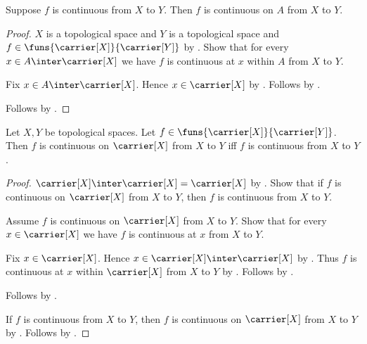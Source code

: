 \begin{corollary}\label{continuous_implies_continuous_on}
    Suppose $f$ is continuous from $X$ to $Y$.
    Then $f$ is continuous on $A$ from $X$ to $Y$.
\end{corollary}
\begin{proof}
    $X$ is a topological space and $Y$ is a topological space and
        $f\in\funs{\carrier[X]}{\carrier[Y]}$ by
        .
    Show that for every $x\in A\inter\carrier[X]$ we have
        $f$ is continuous at $x$ within $A$ from $X$ to $Y$.
    \begin{subproof}
        Fix $x\in A\inter\carrier[X]$.
        Hence $x\in\carrier[X]$ by .
        Follows by .
    \end{subproof}
    Follows by .
\end{proof}

\begin{theorem}\label{continuous_on_carrier_iff_continuous}
    Let $X,Y$ be topological spaces.
    Let $f\in\funs{\carrier[X]}{\carrier[Y]}$.
    Then $f$ is continuous on $\carrier[X]$ from $X$ to $Y$ iff
        $f$ is continuous from $X$ to $Y$.
\end{theorem}
\begin{proof}
    $\carrier[X]\inter\carrier[X]=\carrier[X]$ by
        .
    Show that if $f$ is continuous on $\carrier[X]$ from $X$ to $Y$,
        then $f$ is continuous from $X$ to $Y$.
    \begin{subproof}
        Assume $f$ is continuous on $\carrier[X]$ from $X$ to $Y$.
        Show that for every $x\in\carrier[X]$ we have
            $f$ is continuous at $x$ from $X$ to $Y$.
        \begin{subproof}
            Fix $x\in\carrier[X]$.
            Hence $x\in\carrier[X]\inter\carrier[X]$ by
                .
            Thus $f$ is continuous at $x$ within $\carrier[X]$ from
                $X$ to $Y$ by .
            Follows by .
        \end{subproof}
        Follows by .
    \end{subproof}
    If $f$ is continuous from $X$ to $Y$, then
        $f$ is continuous on $\carrier[X]$ from $X$ to $Y$ by
        .
    Follows by \auto.
\end{proof}

